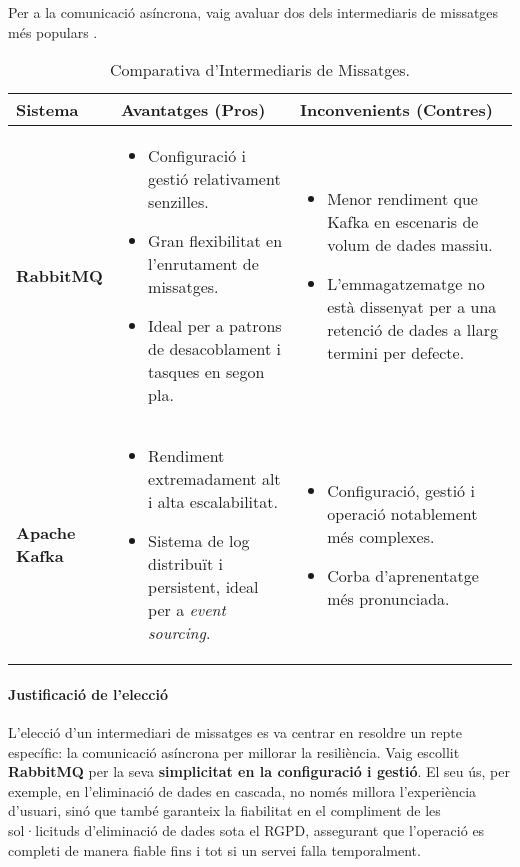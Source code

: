Per a la comunicació asíncrona, vaig avaluar dos dels intermediaris de missatges més populars \cite{cloudamqp-rabbitmq-kafka}.

\begin{table}[h]
\centering
\begin{tabular}{|l|p{4.5cm}|p{4.5cm}|}
\hline
\textbf{Sistema} & \textbf{Avantatges (Pros)} & \textbf{Inconvenients (Contres)} \\
\hline
\textbf{RabbitMQ} & 
\begin{itemize}
    \item Configuració i gestió relativament senzilles.
    \item Gran flexibilitat en l'enrutament de missatges.
    \item Ideal per a patrons de desacoblament i tasques en segon pla.
\end{itemize} & 
\begin{itemize}
    \item Menor rendiment que Kafka en escenaris de volum de dades massiu.
    \item L'emmagatzematge no està dissenyat per a una retenció de dades a llarg termini per defecte.
\end{itemize} \\
\hline
\textbf{Apache Kafka} & 
\begin{itemize}
    \item Rendiment extremadament alt i alta escalabilitat.
    \item Sistema de log distribuït i persistent, ideal per a \textit{event sourcing}.
\end{itemize} & 
\begin{itemize}
    \item Configuració, gestió i operació notablement més complexes.
    \item Corba d'aprenentatge més pronunciada.
\end{itemize} \\
\hline
\end{tabular}
\caption{Comparativa d'Intermediaris de Missatges.}
\label{tab:message_brokers_comparison}
\end{table}

\paragraph{Justificació de l'elecció}
L'elecció d'un intermediari de missatges es va centrar en resoldre un repte específic: la comunicació asíncrona per millorar la resiliència. Vaig escollit \textbf{RabbitMQ} per la seva \textbf{simplicitat en la configuració i gestió}. El seu ús, per exemple, en l'eliminació de dades en cascada, no només millora l'experiència d'usuari, sinó que també garanteix la fiabilitat en el compliment de les sol·licituds d'eliminació de dades sota el RGPD, assegurant que l'operació es completi de manera fiable fins i tot si un servei falla temporalment.

